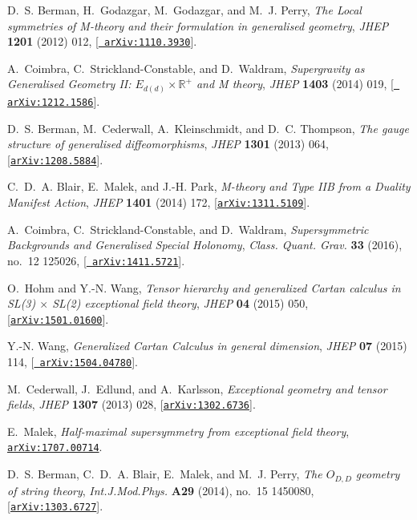 \documentclass{PoS}
\begin{document}
\begin{thebibliography}{99}
D.~S. Berman, H.~Godazgar, M.~Godazgar, and M.~J. Perry, {\it {The Local
  symmetries of M-theory and their formulation in generalised geometry}},  {\em
  JHEP} {\bf 1201} (2012) 012, [\href{http://arxiv.org/abs/1110.3930}{{\tt
  arXiv:1110.3930}}].

A.~Coimbra, C.~Strickland-Constable, and D.~Waldram, {\it {Supergravity as
  Generalised Geometry II: $E_{d(d)} \times \mathbb{R}^+$ and M theory}},  {\em
  JHEP} {\bf 1403} (2014) 019, [\href{http://arxiv.org/abs/1212.1586}{{\tt
  arXiv:1212.1586}}].

D.~S. Berman, M.~Cederwall, A.~Kleinschmidt, and D.~C. Thompson, {\it {The
  gauge structure of generalised diffeomorphisms}},  {\em JHEP} {\bf 1301}
  (2013) 064, [\href{http://arxiv.org/abs/1208.5884}{{\tt arXiv:1208.5884}}].

C.~D.~A. Blair, E.~Malek, and J.-H. Park, {\it {M-theory and Type IIB from a
  Duality Manifest Action}},  {\em JHEP} {\bf 1401} (2014) 172,
  [\href{http://arxiv.org/abs/1311.5109}{{\tt arXiv:1311.5109}}].

A.~Coimbra, C.~Strickland-Constable, and D.~Waldram, {\it {Supersymmetric
  Backgrounds and Generalised Special Holonomy}},  {\em Class. Quant. Grav.}
  {\bf 33} (2016), no.~12 125026, [\href{http://arxiv.org/abs/1411.5721}{{\tt
  arXiv:1411.5721}}].

O.~Hohm and Y.-N. Wang, {\it {Tensor hierarchy and generalized Cartan calculus
  in SL(3) $\times$ SL(2) exceptional field theory}},  {\em JHEP} {\bf 04}
  (2015) 050, [\href{http://arxiv.org/abs/1501.01600}{{\tt arXiv:1501.01600}}].

Y.-N. Wang, {\it {Generalized Cartan Calculus in general dimension}},  {\em
  JHEP} {\bf 07} (2015) 114, [\href{http://arxiv.org/abs/1504.04780}{{\tt
  arXiv:1504.04780}}].

M.~Cederwall, J.~Edlund, and A.~Karlsson, {\it {Exceptional geometry and tensor
  fields}},  {\em JHEP} {\bf 1307} (2013) 028,
  [\href{http://arxiv.org/abs/1302.6736}{{\tt arXiv:1302.6736}}].

E.~Malek, {\it {Half-maximal supersymmetry from exceptional field theory}},
  \href{http://arxiv.org/abs/1707.00714}{{\tt arXiv:1707.00714}}.

D.~S. Berman, C.~D.~A. Blair, E.~Malek, and M.~J. Perry, {\it {The $O_{D,D}$
  geometry of string theory}},  {\em Int.J.Mod.Phys.} {\bf A29} (2014), no.~15
  1450080, [\href{http://arxiv.org/abs/1303.6727}{{\tt arXiv:1303.6727}}].


\end{thebibliography}
\end{document}
